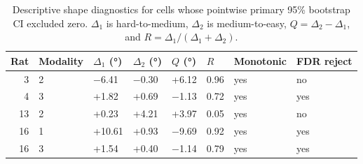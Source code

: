 \begin{table}[htbp]
  \centering
  \caption{Descriptive shape diagnostics for cells whose pointwise primary 95\% bootstrap CI excluded zero. $\Delta_1$ is hard-to-medium, $\Delta_2$ is medium-to-easy, $Q=\Delta_2-\Delta_1$, and $R=\Delta_1/(\Delta_1+\Delta_2)$.}
  \label{tab:perceptual_bias_shape_diagnostics}
  \begin{tabular}{rlllllll}
    \toprule
    Rat & Modality & $\Delta_1$ (°) & $\Delta_2$ (°) & $Q$ (°) & $R$ & Monotonic & FDR reject \\
    \midrule
    3 & 2 & −6.41 & −0.30 & +6.12 & 0.96 & yes & no \\
    4 & 3 & +1.82 & +0.69 & −1.13 & 0.72 & yes & yes \\
    13 & 2 & +0.23 & +4.21 & +3.97 & 0.05 & yes & no \\
    16 & 1 & +10.61 & +0.93 & −9.69 & 0.92 & yes & yes \\
    16 & 3 & +1.54 & +0.40 & −1.14 & 0.79 & yes & yes \\
    \bottomrule
  \end{tabular}
\end{table}

